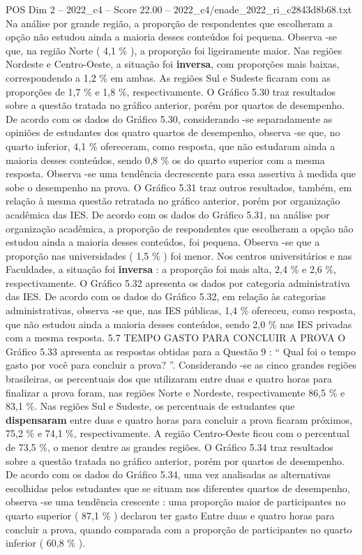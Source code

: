 \begin{textsample}{POS Dim 2 – 2022\_c4 – Score 22.00 – 2022\_c4/enade\_2022\_ri\_c2843d8b68.txt}
Na análise por grande região, a proporção de respondentes que escolheram a opção não estudou ainda a maioria desses conteúdos foi pequena.
Observa -se que, na região Norte ( 4,1 \% ), a proporção foi ligeiramente maior.
Nas regiões Nordeste e Centro-Oeste, a situação foi \textbf{inversa}, com proporções mais baixas, correspondendo a 1,2 \% em ambas.
As regiões Sul e Sudeste ficaram com as proporções de 1,7 \% e 1,8 \%, respectivamente.
O Gráfico 5.30 traz resultados sobre a questão tratada no gráfico anterior, porém por quartos de desempenho.
De acordo com os dados do Gráfico 5.30, considerando -se separadamente as opiniões de estudantes dos quatro quartos de desempenho, observa -se que, no quarto inferior, 4,1 \% ofereceram, como resposta, que não estudaram ainda a maioria desses conteúdos, sendo 0,8 \% os do quarto superior com a mesma resposta.
Observa -se uma tendência decrescente para essa assertiva à medida que sobe o desempenho na prova.
O Gráfico 5.31 traz outros resultados, também, em relação à mesma questão retratada no gráfico anterior, porém por organização acadêmica das IES.
De acordo com os dados do Gráfico 5.31, na análise por organização acadêmica, a proporção de respondentes que escolheram a opção não estudou ainda a maioria desses conteúdos, foi pequena.
Observa -se que a proporção nas universidades ( 1,5 \% ) foi menor.
Nos centros universitários e nas Faculdades, a situação foi \textbf{inversa} : a proporção foi mais alta, 2,4 \% e 2,6 \%, respectivamente.
O Gráfico 5.32 apresenta os dados por categoria administrativa das IES.
De acordo com os dados do Gráfico 5.32, em relação às categorias administrativas, observa -se que, nas IES públicas, 1,4 \% ofereceu, como resposta, que não estudou ainda a maioria desses conteúdos, sendo 2,0 \% nas IES privadas com a mesma resposta. 5.7 TEMPO GASTO PARA CONCLUIR A PROVA O Gráfico 5.33 apresenta as respostas obtidas para a Questão 9 : “ Qual foi o tempo gasto por você para concluir a prova? ”.
Considerando -se as cinco grandes regiões brasileiras, os percentuais dos que utilizaram entre duas e quatro horas para finalizar a prova foram, nas regiões Norte e Nordeste, respectivamente 86,5 \% e 83,1 \%.
Nas regiões Sul e Sudeste, os percentuais de estudantes que \textbf{dispensaram} entre duas e quatro horas para concluir a prova ficaram próximos, 75,2 \% e 74,1 \%, respectivamente.
A região Centro-Oeste ficou com o percentual de 73,5 \%, o menor dentre as grandes regiões.
O Gráfico 5.34 traz resultados sobre a questão tratada no gráfico anterior, porém por quartos de desempenho.
De acordo com os dados do Gráfico 5.34, uma vez analisadas as alternativas escolhidas pelos estudantes que se situam nos diferentes quartos de desempenho, observa -se uma tendência crescente : uma proporção maior de participantes no quarto superior ( 87,1 \% ) declarou ter gasto Entre duas e quatro horas para concluir a prova, quando comparada com a proporção de participantes no quarto inferior ( 60,8 \% ).

\end{textsample}
